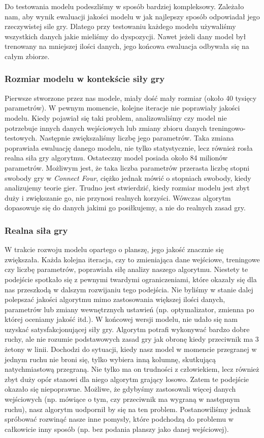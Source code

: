 \documentclass[12pt]{article}
\begin{document}
Do testowania modelu podeszliśmy w sposób bardziej kompleksowy. Zależało nam, aby wynik ewaluacji jakości modelu w jak najlepszy sposób odpowiadał jego rzeczywistej sile gry. Dlatego przy testowaniu każdego modelu używaliśmy wszystkich danych jakie mieliśmy do dyspozycji. Nawet jeżeli dany model był trenowany na mniejszej ilości danych, jego końcowa ewaluacja odbywała się na całym zbiorze.

\subsubsection{Rozmiar modelu w kontekście siły gry}

Pierwsze stworzone przez nas modele, miały dość mały rozmiar (około 40 tysięcy parametrów). W pewnym momencie, kolejne iteracje nie poprawiały jakości modelu. Kiedy pojawiał się taki problem, analizowaliśmy czy model nie potrzebuje innych danych wejściowych lub zmiany zbioru danych treningowo-testowych. Następnie zwiększaliśmy liczbę jego parametrów. Taka zmiana poprawiała ewaluację danego modelu, nie tylko statystycznie, lecz również rosła realna siła gry algorytmu. Ostateczny model posiada około 84 milionów parametrów. Możliwym jest, że taka liczba parametrów przerasta liczbę stopni swobody gry w \textit{Connect Four}, ciężko jednak mówić o stopniach swobody, kiedy analizujemy teorie gier. Trudno jest stwierdzić, kiedy rozmiar modelu jest zbyt duży i zwiększanie go, nie przynosi realnych korzyści. Wówczas algorytm dopasowuje się do danych jakimi go posiłkujemy, a nie do realnych zasad gry.

\subsubsection{Realna siła gry}

W trakcie rozwoju modelu opartego o planszę, jego jakość znacznie się zwiększała. Każda kolejna iteracja, czy to zmieniająca dane wejściowe, treningowe czy liczbę parametrów, poprawiała siłę analizy naszego algorytmu. Niestety te podejście spotkało się z pewnymi twardymi ograniczeniami, które okazały się dla nas przeszkodą w dalszym rozwijaniu tego podejścia. Nie byliśmy w stanie dalej polepszać jakości algorytmu mimo zastosowania większej ilości danych, parametrów lub zmiany wewnętrznych ustawień (np. optymalizator, zmienna po której oceniamy jakość itd.). W końcowej wersji modelu, nie udało się nam uzyskać satysfakcjonującej siły gry. Algorytm potrafi wykonywać bardzo dobre ruchy, ale nie rozumie podstawowych zasad gry jak obronę kiedy przeciwnik ma 3 żetony w linii. Dochodzi do sytuacji, kiedy nasz model w momencie przegranej w jednym ruchu nie broni się, tylko wybiera inną kolumnę, skutkującą natychmiastową przegraną. Nie tylko ma on trudności z człowiekiem, lecz również zbyt duży opór stanowi dla niego algorytm grający losowo. Zatem te podejście okazało się niepoprawne. Możliwe, że gdybyśmy zastosowali więcej danych wejściowych (np. mówiące o tym, czy przeciwnik ma wygraną w następnym ruchu), nasz algorytm uodpornił by się na ten problem. Postanowiliśmy jednak spróbować rozwinąć nasze inne pomysły, które podchodzą do problemu w całkowicie inny sposób (np. bez podania planszy jako danej wejściowej).
\end{document}
